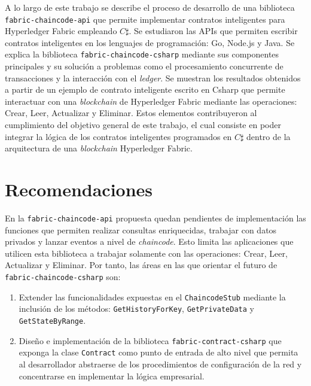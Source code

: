 \begin{conclusions}

A lo largo de este trabajo se describe el proceso de desarrollo de una biblioteca \texttt{fabric-chaincode-api} que permite implementar contratos inteligentes para Hyperledger Fabric empleando $ C \sharp $. Se estudiaron las APIs que permiten escribir contratos inteligentes en los lenguajes de programación: Go, Node.js y Java. Se explica la biblioteca \texttt{fabric-chaincode-csharp} mediante sus componentes principales y su solución a problemas como  el procesamiento concurrente de transacciones y la interacción con el \textit{ledger}. Se muestran los resultados obtenidos a partir de un ejemplo de contrato inteligente escrito en Csharp que permite interactuar con una \textit{blockchain} de Hyperledger Fabric mediante las operaciones: Crear, Leer, Actualizar y Eliminar.
Estos elementos contribuyeron al cumplimiento del objetivo general de este trabajo, el cual consiste en poder integrar la lógica de los contratos inteligentes programados en $ C \sharp $ dentro de la arquitectura de una \textit{blockchain} Hyperledger Fabric.

\section*{Recomendaciones}
En la \texttt{fabric-chaincode-api} propuesta quedan pendientes de implementación las funciones que permiten realizar consultas enriquecidas, trabajar con datos privados y lanzar eventos a nivel de \textit{chaincode}. Esto limita las aplicaciones que utilicen esta biblioteca a trabajar solamente con las operaciones: Crear, Leer, Actualizar y Eliminar. Por tanto, las áreas en las que orientar el futuro de \texttt{fabric-chaincode-csharp} son:
    
\begin{enumerate}
\item Extender las funcionalidades expuestas en el \texttt{ChaincodeStub} mediante la inclusión de los métodos: \texttt{GetHistoryForKey}, \texttt{GetPrivateData} y \texttt{GetStateByRange}.
\item Diseño e implementación de la biblioteca  \texttt{fabric-contract-csharp} que exponga la clase \texttt{Contract} como punto de entrada de alto nivel que permita al desarrollador abstraerse de los procedimientos de configuración de la red y concentrarse en implementar la lógica empresarial.
\end{enumerate}

\end{conclusions}
